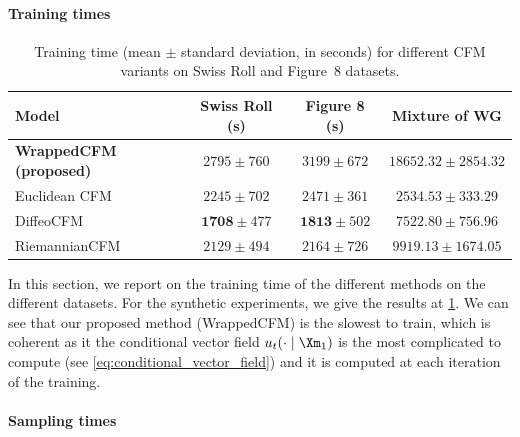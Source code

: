 \documentclass[10pt]{article} %
\theoremstyle{plain}
\theoremstyle{definition}
\theoremstyle{remark}
\begin{document}
\paragraph{Training times}
\begin{table}[ht]
  \centering
  \small
  \setlength{\tabcolsep}{8pt}
  \begin{tabular}{lccc}
    \toprule
    \textbf{Model}
    & \textbf{Swiss Roll (s)}
    & \textbf{Figure 8 (s)}
    & \textbf{Mixture of WG}\\
    \midrule
    \textbf{WrappedCFM (proposed)}
    & $2795 \pm 760$
    & $3199 \pm 672$
    &$18652.32 \pm 2854.32$ \\

    Euclidean CFM
    & $2245 \pm 702$
    & $2471 \pm 361$
    & $2534.53 \pm 333.29$ \\

    DiffeoCFM
    & $\mathbf{1708} \pm 477$
    & $\mathbf{1813} \pm 502$
    & $7522.80 \pm 756.96$\\

    RiemannianCFM
    & $2129 \pm 494$
    & $2164 \pm 726$
    & $9919.13 \pm 1674.05$\\
    \bottomrule
  \end{tabular}
  \caption{Training time (mean $\pm$ standard deviation, in seconds) for different CFM variants on Swiss Roll and Figure~8 datasets.}
  \label{tab:training_time_synthetic_exp}
\end{table}

In this section, we report on the training time of the different methods on the different datasets. For the synthetic experiments, we give the results at \cref{tab:training_time_synthetic_exp}. We can see that our proposed method (WrappedCFM) is the slowest to train, which is coherent as it the conditional vector field $u_t(\cdot \mid \Xm_1)$ is the most complicated to compute (see \cref{eq:conditional_vector_field}) and it is computed at each iteration of the training.

\paragraph{Sampling times}
\end{document}
